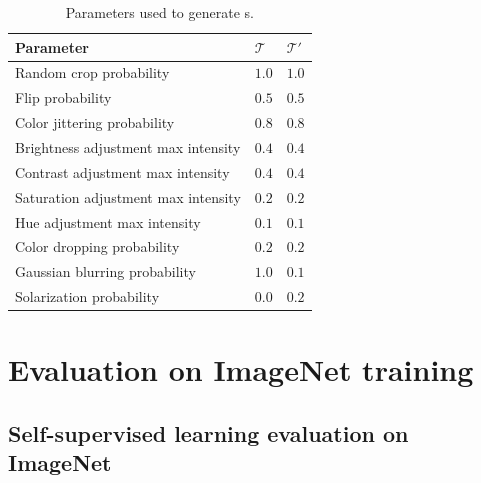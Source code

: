 \begin{table}[ht]
    \small
    \centering
    \begin{tabular}{l l l} \toprule
        Parameter & $\mathcal{T}$ & $\mathcal{T}'$ \\ \midrule
        Random crop probability & $1.0$ & $1.0$ \\
        Flip probability & $0.5$ & $0.5$ \\
        Color jittering probability & $0.8$ & $0.8$ \\
        Brightness adjustment max intensity & $0.4$ & $0.4$ \\
        Contrast adjustment max intensity & $0.4$ & $0.4$ \\
        Saturation adjustment max intensity & $0.2$ & $0.2$ \\
        Hue adjustment max intensity & $0.1$ & $0.1$ \\
        Color dropping probability & $0.2$ & $0.2$ \\
        Gaussian blurring probability & $1.0$ & $0.1$ \\
        Solarization probability & $0.0$ & $0.2$ \\ \bottomrule
    \end{tabular}
     \vspace{0.5em}
    \caption{Parameters used to generate \imageaugmentation s.}
    \label{tab:transformation_distributions}
\end{table}

\section{Evaluation on ImageNet training}
\label{app:eval_details}

\subsection{Self-supervised learning evaluation on ImageNet}
